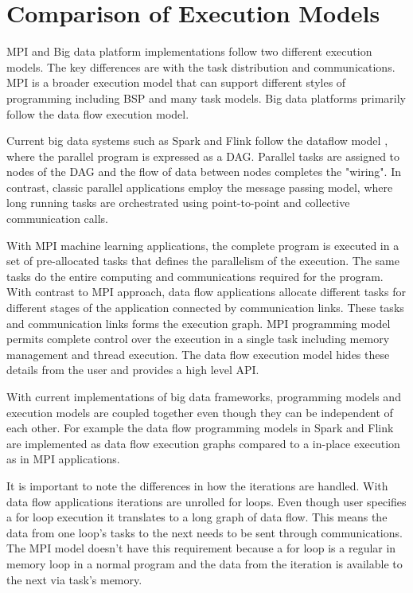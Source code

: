 \documentclass[10pt, conference, compsocconf]{IEEEtran}
\begin{document}
\section{Comparison of Execution Models} \label{sec:exec_models}
MPI and Big data platform implementations follow two different execution models. The key differences are with the task distribution and communications. MPI is a broader execution model that can support different styles of programming including BSP and many task models. Big data platforms primarily follow the data flow execution model. 

Current big data systems such as Spark and Flink follow the dataflow model , where the parallel program is expressed as a \ac{DAG}. Parallel tasks are assigned to nodes of the \ac{DAG} and the flow of data between nodes completes the "wiring". In contrast, classic parallel applications employ the message passing model, where long running tasks are orchestrated using point-to-point and collective communication calls.

With MPI machine learning applications, the complete program is executed in a set of pre-allocated tasks that defines the parallelism of the execution. The same tasks do the entire computing and communications required for the program. With contrast to MPI approach, data flow applications allocate different tasks for different stages of the application connected by communication links. These tasks and communication links forms the execution graph. MPI  programming model permits complete control over the execution in a single task including memory management and thread execution. The data flow execution model hides these details from the user and provides a high level API. 

With current implementations of big data frameworks, programming models and execution models are coupled together even though they can be independent of each other. For example the data flow programming models in Spark and Flink are implemented as data flow execution graphs compared to a in-place execution as in MPI applications.

It is important to note the differences in how the iterations are handled. With data flow applications iterations are unrolled for loops. Even though user specifies a for loop execution it translates to a long graph of data flow. This means the data from one loop's tasks to the next needs to be sent through communications. The MPI model doesn't have this requirement because a for loop is a regular in memory loop in a normal program and the data from the iteration is available to the next via task's memory. 
\end{document}
